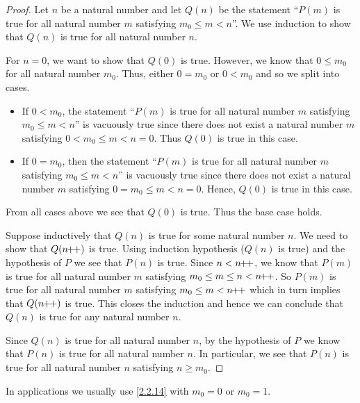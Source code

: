 \begin{proof}
  Let \(n\) be a natural number and let \(Q(n)\) be the statement ``\(P(m)\) is true for all natural number \(m\) satisfying \(m_0 \leq m < n\)''.
  We use induction to show that \(Q(n)\) is true for all natural number \(n\).

  For \(n = 0\), we want to show that \(Q(0)\) is true.
  However, we know that \(0 \leq m_0\) for all natural number \(m_0\).
  Thus, either \(0 = m_0\) or \(0 < m_0\) and so we split into cases.
  \begin{itemize}
    \item If \(0 < m_0\), the statement ``\(P(m)\) is true for all natural number \(m\) satisfying \(m_0 \leq m < n\)'' is vacuously true since there does not exist a natural number \(m\) satisfying \(0 < m_0 \leq m < n = 0\).
          Thus \(Q(0)\) is true in this case.
    \item If \(0 = m_0\), then the statement ``\(P(m)\) is true for all natural number \(m\) satisfying \(m_0 \leq m < n\)'' is vacuously true since there does not exist a natural number \(m\) satisfying \(0 = m_0 \leq m < n = 0\).
          Hence, \(Q(0)\) is true in this case.
  \end{itemize}
  From all cases above we see that \(Q(0)\) is true.
  Thus the base case holds.

  Suppose inductively that \(Q(n)\) is true for some natural number \(n\).
  We need to show that \(Q(n\!\!+\!\!+)\) is true.
  Using induction hypothesis (\(Q(n)\) is true) and the hypothesis of \(P\) we see that \(P(n)\) is true.
  Since \(n < n\!\!+\!\!+\), we know that \(P(m)\) is true for all natural number \(m\) satisfying \(m_0 \leq m \leq n < n\!\!+\!\!+\).
  So \(P(m)\) is true for all natural number \(m\) satisfying \(m_0 \leq m < n\!\!+\!\!+\) which in turn implies that \(Q(n\!\!+\!\!+)\) is true.
  This closes the induction and hence we can conclude that \(Q(n)\) is true for any natural number \(n\).

  Since \(Q(n)\) is true for all natural number \(n\), by the hypothesis of \(P\) we know that \(P(n)\) is true for all natural number \(n\).
  In particular, we see that \(P(n)\) is true for all natural number \(n\) satisfying \(n \geq m_0\).
\end{proof}

\begin{rmk}\label{2.2.15}
  In applications we usually use \cref{2.2.14} with \(m_0 = 0\) or \(m_0 = 1\).
\end{rmk}

\exercisesection

